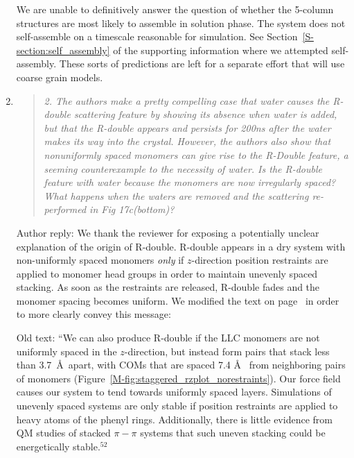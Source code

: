 \documentclass{article}
\begin{document}
\begin{enumerate}
    We are unable to definitively answer the question of whether the 5-column 
    structures are most likely to assemble in solution phase. The system does
    not self-assemble on a timescale reasonable for simulation. See 
    Section~\ref{S-section:self_assembly} of the supporting information where
    we attempted self-assembly. These sorts of predictions are left for 
    a separate effort that will use coarse grain models.
    
    \item \begin{quote}
    \textit{2. The authors make a pretty compelling case that water causes the
    R-double scattering feature by showing its absence when water is added, but
    that the R-double appears and persists for 200ns after the water makes its way
    into the crystal. However, the authors also show that nonuniformly spaced
    monomers can give rise to the R-Double feature, a seeming counterexample to the
    necessity of water.  Is the R-double feature with water because the monomers
    are now irregularly spaced? What happens when the waters are removed and the
    scattering re-performed in Fig 17c(bottom)?}
    \end{quote}
    
    Author reply: We thank the reviewer for exposing a potentially unclear
    explanation of the origin of R-double. R-double appears in a dry system with
    non-uniformly spaced monomers \textit{only} if $z$-direction position
    restraints are applied to monomer head groups in order to maintain unevenly
    spaced stacking. As soon as the restraints are released, R-double fades and the
    monomer spacing becomes uniform. We modified the text on page~\pageref{M-modification:rdouble}
    in order to more clearly convey this message:
 
    Old text: ``We can also produce R-double if the LLC monomers are not
    uniformly spaced in the $z$-direction, but instead form pairs that stack less
    than 3.7~\AA~apart, with COMs that are spaced 7.4 \AA~ from neighboring pairs
    of monomers (Figure~\ref{M-fig:staggered_rzplot_norestraints}). Our force field
    causes our system to tend towards uniformly spaced layers. Simulations of
    unevenly spaced systems are only stable if position restraints are applied to
    heavy atoms of the phenyl rings. Additionally, there is little evidence from QM
    studies of stacked $\pi-\pi$ systems that such uneven stacking could be
    energetically stable.$^{52}$%


\end{enumerate}
\end{document}

